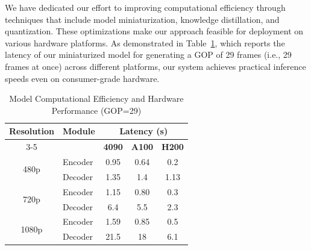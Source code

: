 \documentclass{fairmeta}
\begin{document}



We have dedicated our effort to improving computational efficiency through techniques that include model miniaturization, knowledge distillation, and quantization. These optimizations make our approach feasible for deployment on various hardware platforms. As demonstrated in Table~\ref{tab:hardware_performance}, which reports the latency of our miniaturized model for generating a GOP of 29 frames (i.e., 29 frames at once) across different platforms, our system achieves practical inference speeds even on consumer-grade hardware.




\begin{table}[h]
\centering
\caption{Model Computational Efficiency and Hardware Performance (GOP=29)}
\label{tab:hardware_performance}
\begin{tabular}{c|l|c|c|c}
\hline
\multirow{2}{*}{\textbf{Resolution}} & \multirow{2}{*}{\textbf{Module}} & \multicolumn{3}{c}{\textbf{Latency (s)}} \\
\cline{3-5}
 & & \textbf{4090} & \textbf{A100} & \textbf{H200} \\
\hline
\multirow{2}{*}{480p} & Encoder & 0.95 & 0.64 & 0.2 \\
\cline{2-5}
 & Decoder & 1.35 & 1.4 & 1.13 \\
\hline
\multirow{2}{*}{720p} & Encoder & 1.15 & 0.80 & 0.3 \\
\cline{2-5}
 & Decoder & 6.4 & 5.5 & 2.3 \\
\hline
\multirow{2}{*}{1080p} & Encoder & 1.59  & 0.85 & 0.5 \\
\cline{2-5}
 & Decoder & 21.5 & 18 & 6.1 \\
\hline
\end{tabular}
\end{table}
\end{document}
